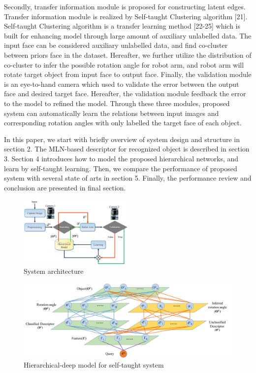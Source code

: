 \documentclass[journal]{IEEEtran}
\begin{document}
Secondly, transfer information module is proposed for constructing latent edges. Transfer information module is realized by Self-taught Clustering algorithm [21]. Self-taught Clustering algorithm is a transfer learning method [22-25] which is built for enhancing model through large amount of auxiliary unlabelled data. The input face can be considered auxiliary unlabelled data, and find co-cluster between priors face in the dataset. Hereafter, we further utilize the distribution of co-cluster to infer the possible rotation angle for robot arm, and robot arm will rotate target object from input face to output face. Finally, the validation module is an eye-to-hand camera which used to validate the error between the output face and desired target face. Hereafter, the validation module feedback the error to the model to refined the model. Through these three modules, proposed system can automatically learn the relations between input images and corresponding rotation angles with only labelled the target face of each object.

In this paper, we start with briefly overview of system design and structure in section 2. The MLN-based descriptor for recognized object is described in section 3. Section 4 introduces how to model the proposed hierarchical networks, and learn by self-taught learning. Then, we compare the performance of proposed system with several state of arts in section 5. Finally, the performance review and conclusion are presented in final section.

\begin{figure}[!t]
\begin{center}
\includegraphics[width=0.5\textwidth]{j_img/fig1.jpg}
\caption{System architecture}\label{test}
\end{center}
\end{figure}

\begin{figure}[!t]
\begin{center}
\includegraphics*[width=7 in]{j_img/fig3.jpg}
\caption{Hierarchical-deep model for self-taught system}\label{test}
\end{center}
\end{figure}
\end{document}
